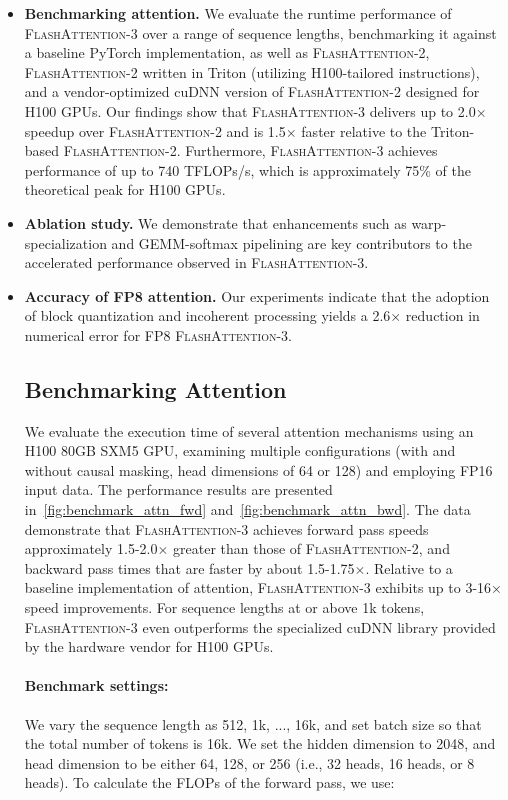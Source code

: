 \begin{enumerate}
\begin{algorithm}[H]
\begin{algorithmic}[1]
\begin{enumerate}
\begin{itemize}
\item \textbf{Benchmarking attention.} We evaluate the runtime performance of \textsc{FlashAttention-3} over a range of sequence lengths, benchmarking it against a baseline PyTorch implementation, as well as \textsc{FlashAttention-2}, \textsc{FlashAttention-2} written in Triton (utilizing H100-tailored instructions), and a vendor-optimized cuDNN version of \textsc{FlashAttention-2} designed for H100 GPUs. Our findings show that \textsc{FlashAttention-3} delivers up to 2.0$\times$ speedup over \textsc{FlashAttention-2} and is 1.5$\times$ faster relative to the Triton-based \textsc{FlashAttention-2}. Furthermore, \textsc{FlashAttention-3} achieves performance of up to 740 TFLOPs/s, which is approximately 75\% of the theoretical peak for H100 GPUs.
\item \textbf{Ablation study.} We demonstrate that enhancements such as warp-specialization and GEMM-softmax pipelining are key contributors to the accelerated performance observed in \textsc{FlashAttention-3}.
\item \textbf{Accuracy of FP8 attention.} Our experiments indicate that the adoption of block quantization and incoherent processing yields a 2.6$\times$ reduction in numerical error for FP8 \textsc{FlashAttention-3}.

\subsection{Benchmarking Attention}
\label{subsec:benchmark_attn}

We evaluate the execution time of several attention mechanisms using an H100 80GB SXM5 GPU, examining multiple configurations (with and without causal masking, head dimensions of 64 or 128) and employing FP16 input data. The performance results are presented in~\cref{fig:benchmark_attn_fwd} and~\cref{fig:benchmark_attn_bwd}. The data demonstrate that \textsc{FlashAttention-3} achieves forward pass speeds approximately 1.5-2.0$\times$ greater than those of \textsc{FlashAttention-2}, and backward pass times that are faster by about 1.5-1.75$\times$. Relative to a baseline implementation of attention, \textsc{FlashAttention-3} exhibits up to 3-16$\times$ speed improvements. For sequence lengths at or above 1k tokens, \textsc{FlashAttention-3} even outperforms the specialized cuDNN library provided by the hardware vendor for H100 GPUs.

\paragraph{Benchmark settings:} We vary the sequence length as 512, 1k, ..., 16k, and set batch size so that the total number of tokens is 16k. We set the hidden dimension to 2048, and head dimension to be either 64, 128, or 256 (i.e., 32 heads, 16 heads, or 8 heads). To calculate the FLOPs of the forward pass, we use:


\end{itemize}
\end{enumerate}
\end{algorithmic}
\end{algorithm}
\end{enumerate}
